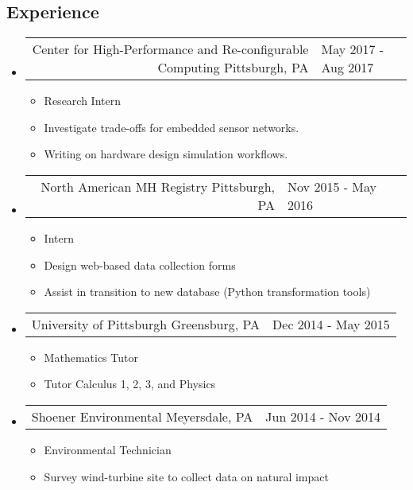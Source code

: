 \documentclass[18pt]{article}
\makeatletter
\providecommand{\tightlist}{
    \setlength{\itemsep}{0pt}\setlength{\parskip}{0pt}
}
\providecommand{\datetable}[2]{
    \begin{tabular*}{\textwidth}{r @{\extracolsep{\fill}} l}
        #1 & #2
    \end{tabular*}
}
\makeatother
\begin{document}
    \subsection*{Experience}\label{experience}
      \begin{itemize}\tightlist
        
        \item
        \datetable
            {Center for High-Performance and Re-configurable Computing \textbar{} Pittsburgh, PA}
            {May 2017 - Aug 2017}
        \begin{itemize}\tightlist
          \item Research Intern
          \item Investigate trade-offs for embedded sensor networks.
          \item Writing on hardware design simulation workflows.
      	\end{itemize}
        
        \item
        \datetable
            {North American MH Registry \textbar{} Pittsburgh, PA}
            {Nov 2015 - May 2016}
        \begin{itemize}\tightlist
          \item Intern
          \item Design web-based data collection forms
          \item Assist in transition to new database (Python transformation tools)
        \end{itemize}

        \item \datetable
            {University of Pittsburgh \textbar{} Greensburg, PA}
            {Dec 2014 - May 2015}
        \begin{itemize}\tightlist
          \item Mathematics Tutor
          \item Tutor Calculus 1, 2, 3, and Physics
        \end{itemize}
        
        \item \datetable 
            {Shoener Environmental \textbar{} Meyersdale, PA}
            {Jun 2014 - Nov 2014}
        \begin{itemize}\tightlist
          \item Environmental Technician
          \item Survey wind-turbine site to collect data on natural impact
        \end{itemize}

      \end{itemize} %
      
\end{document}
